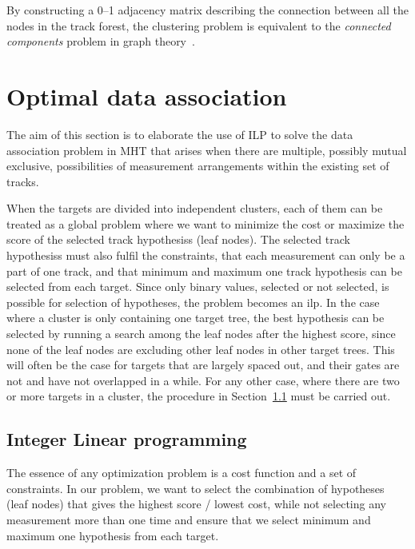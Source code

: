 By constructing a 0--1 adjacency matrix describing the connection between all the nodes in the track forest, the clustering problem is equivalent to the \emph{connected components} problem in graph theory~\cite{Chen2015}.

\section{Optimal data association}\label{sec:optim_data_association}
The aim of this section is to elaborate the use of ILP to solve the data association problem in MHT that arises when there are multiple, possibly mutual exclusive, possibilities of measurement arrangements within the existing set of tracks.

When the targets are divided into independent clusters, each of them can be treated as a global problem where we want to minimize the cost or maximize the score of the selected \glspl{track hypothesis} (leaf nodes). The selected \glspl{track hypothesis} must also fulfil the constraints, that each measurement can only be a part of one track, and that minimum and maximum one track hypothesis can be selected from each target. Since only binary values, selected or not selected, is possible for selection of hypotheses, the problem becomes an \gls{ilp}. In the case where a cluster is only containing one target tree, the best hypothesis can be selected by running a search among the leaf nodes after the highest score, since none of the leaf nodes are excluding other leaf nodes in other target trees. This will often be the case for targets that are largely spaced out, and their gates are not and have not overlapped in a while. For any other case, where there are two or more targets in a cluster, the procedure in Section~\ref{subsec:integer_linear_programming} must be carried out. 

\subsection{Integer Linear programming}\label{subsec:integer_linear_programming}
The essence of any optimization problem is a cost function and a set of constraints. In our problem, we want to select the combination of hypotheses (leaf nodes) that gives the highest score / lowest cost, while not selecting any measurement more than one time and ensure that we select minimum and maximum one hypothesis from each target. 

